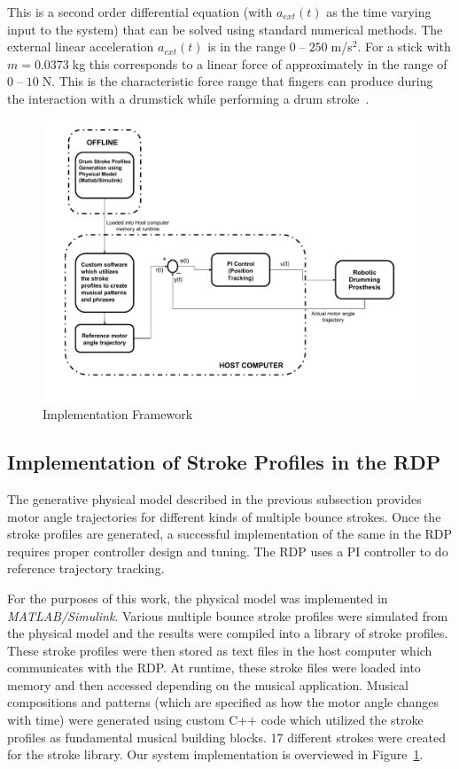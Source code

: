 \documentclass[final,1p,times]{elsarticle}
\begin{document}
This is a second order differential equation (with $a_{ext}(t)$ as the time varying input to the system) that can be solved using standard numerical methods. The external linear acceleration $a_{ext}(t)$ is in the range $0\;$--$\;250\;$m/s$^2$. For a stick with $m = 0.0373\;$kg this corresponds to a linear force of approximately in the range of $0\;$--$\;10\;$N. This is the characteristic force range that fingers can produce during the interaction with a drumstick while performing a drum stroke~\cite{hajian1997characterization}. 
\begin{figure}[H]
	\begin{center}
		\includegraphics[width = 1.02\hsize]{./figures/Fig3.pdf}
		\caption{Implementation Framework}
		\label{FW}
	\end{center}
\end{figure}
\subsection{Implementation of Stroke Profiles in the RDP}
The generative physical model described in the previous subsection provides motor angle trajectories for different kinds of multiple bounce strokes. Once the stroke profiles are generated, a successful implementation of the same in the RDP requires proper controller design and tuning. The RDP uses a PI controller to do reference trajectory tracking. 

For the purposes of this work, the physical model was implemented in \textit{MATLAB/Simulink}. Various multiple bounce stroke profiles were simulated from the physical model and the results were compiled into a library of stroke profiles. These stroke profiles were then stored as text files in the host computer which communicates with the RDP. At runtime, these stroke files were loaded into memory and then accessed depending on the musical application. Musical compositions and patterns (which are specified as how the motor angle changes with time) were generated using custom C++ code which utilized the stroke profiles as fundamental musical building blocks. 17 different strokes were created for the stroke library. Our system implementation is overviewed in Figure~\ref{FW}.
\end{document}

